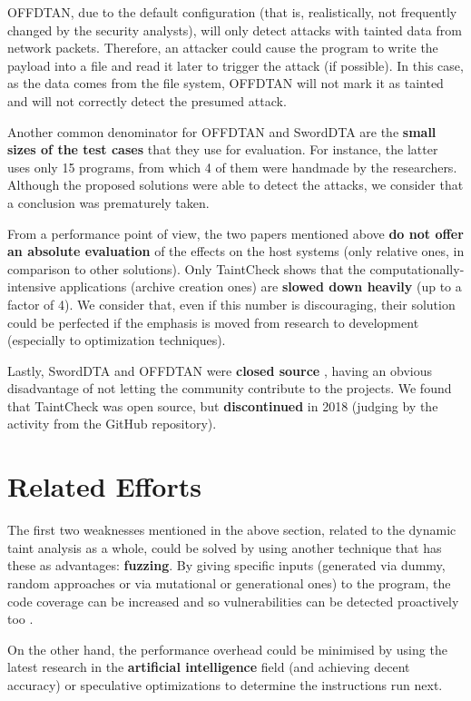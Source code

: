 \documentclass[10pt,a4paper,english,onecolumn]{IEEEtran}
\begin{document}
OFFDTAN, due to the default configuration (that is, realistically, not frequently changed by the security analysts), will only detect attacks with tainted data from network packets. Therefore, an attacker could cause the program to write the payload into a file and read it later to trigger the attack (if possible). In this case, as the data comes from the file system, OFFDTAN will not mark it as tainted and will not correctly detect the presumed attack.

Another common denominator for OFFDTAN and SwordDTA are the \textbf{small sizes of the test cases} that they use for evaluation. For instance, the latter uses only 15 programs, from which 4 of them were handmade by the researchers. Although the proposed solutions were able to detect the attacks, we consider that a conclusion was prematurely taken.

From a performance point of view, the two papers mentioned above \textbf{do not offer an absolute evaluation} of the effects on the host systems (only relative ones, in comparison to other solutions). Only TaintCheck shows that the computationally-intensive applications (archive creation ones) are \textbf{slowed down heavily} (up to a factor of 4). We consider that, even if this number is discouraging, their solution could be perfected if the emphasis is moved from research to development (especially to optimization techniques).

Lastly, SwordDTA and OFFDTAN were \textbf{closed source} , having an obvious disadvantage of not letting the community contribute to the projects. We found that TaintCheck was open source, but \textbf{discontinued} in 2018 (judging by the activity from the GitHub repository).

\section{Related Efforts}

The first two weaknesses mentioned in the above section, related to the dynamic taint analysis as a whole, could be solved by using another technique that has these as advantages: \textbf{fuzzing}. By giving specific inputs (generated via dummy, random approaches or via mutational or generational ones) to the program, the code coverage can be increased and so vulnerabilities can be detected proactively too \cite{fuzzy_dta}.

On the other hand, the performance overhead could be minimised by using the latest research in the \textbf{artificial intelligence} field (and achieving decent accuracy) \cite{neutaint} or speculative optimizations \cite{speculative_dta} to determine the instructions run next.
\end{document}

